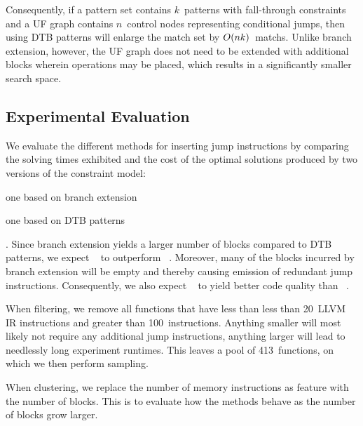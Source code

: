 Consequently, if a \gls{pattern set} contains $k$~\glspl{pattern} with
\gls{fall-through} \glspl{constraint} and a \gls{UF graph} contains
$n$~\glspl{control node} representing conditional jumps, then using \glspl{DTB
  pattern} will enlarge the \gls{match set} by $O(nk)$~\glspl{match}.
%
Unlike \gls{branch extension}, however, the \gls{UF graph} does not need to be
extended with additional \glspl{block} wherein \glspl{operation} may be placed,
which results in a significantly smaller \gls{search space}.


\subsection{Experimental Evaluation}

We evaluate the different methods for inserting jump \glspl{instruction} by
comparing the solving times exhibited and the cost of the optimal
\glspl{solution} produced by two versions of the \gls{constraint model}:
%
\begin{modelList}
  \item {}
    one based on \gls{branch extension}
  \item {}
    one based on \glspl{DTB pattern}
\end{modelList}.
%
Since \gls{branch extension} yields a larger number of \glspl{block} compared to
\glspl{DTB pattern}, we expect ~ to outperform ~.
%
Moreover, many of the \glspl{block} incurred by \gls{branch extension} will be
empty and thereby causing emission of redundant jump \glspl{instruction}.
%
Consequently, we also expect ~
to yield better code quality than ~.

When filtering, we remove all \glspl{function} that have less than less than
\num{20}~\gls{LLVM} \gls{IR} \glspl{instruction} and greater than
\num{100}~\glspl{instruction}.
%
Anything smaller will most likely not require any additional jump
\glspl{instruction}, anything larger will lead to needlessly long experiment
runtimes.
%
This leaves a pool of \num{413}~\glspl{function}, on which we then perform
sampling.

When clustering, we replace the number of memory \glspl{instruction} as feature
with the number of \glspl{block}.
%
This is to evaluate how the methods behave as the number of \glspl{block} grow
larger.


